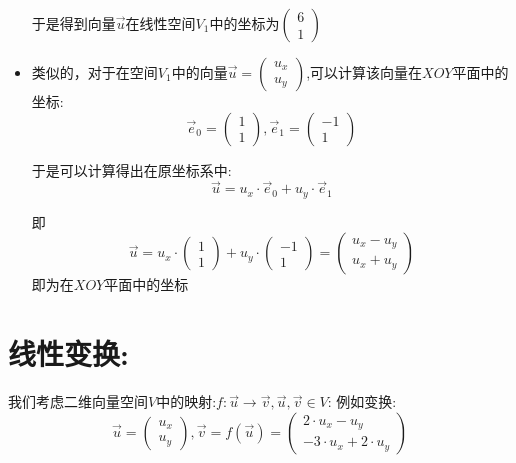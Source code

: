\documentclass[UTF8]{article}
\begin{document}
\begin{itemize}
于是得到向量$\vec{u}$在线性空间$V_1$中的坐标为$
\left(
\begin{array}{l}
6 \\
1
\end{array}
\right)
$

	\item 
类似的，对于在空间$V_1$中的向量$\vec{u} = 
\left(
\begin{array}{l}
u_x \\ 
u_y
\end{array}
\right)
$,可以计算该向量在$XOY$平面中的坐标:
$$ \vec{e}_0 = 
\left(
\begin{array}{l}
1 \\ 
1
\end{array}
\right),
\vec{e}_1 = 
\left(
\begin{array}{l}
-1 \\ 
1
\end{array}
\right)$$

于是可以计算得出在原坐标系中:
$$\vec{u} = u_x\cdot \vec{e}_0 + u_y\cdot\vec{e}_1$$

即$$\vec{u} = u_x\cdot \left(
\begin{array}{l}
1 \\ 
1
\end{array}
\right) + u_y\cdot \left(
\begin{array}{l}
-1 \\ 
1
\end{array}
\right) = 
\left(
\begin{array}{l}
u_x - u_y \\ 
u_x + u_y
\end{array}
\right)$$
即为在$XOY$平面中的坐标

\end{itemize}

\section{线性变换:}

我们考虑二维向量空间$V$中的映射:$f:\vec{u}\rightarrow \vec{v}, \vec{u},\vec{v} \in V$:
例如变换:
$$\vec{u} = \left(
\begin{array}{l}
u_x \\ 
u_y
\end{array}
\right), \vec{v} = f(\vec{u}) = \left(
\begin{array}{l}
2\cdot u_x - u_y \\ 
-3\cdot u_x + 2\cdot u_y
\end{array}
\right)$$
\end{document}
